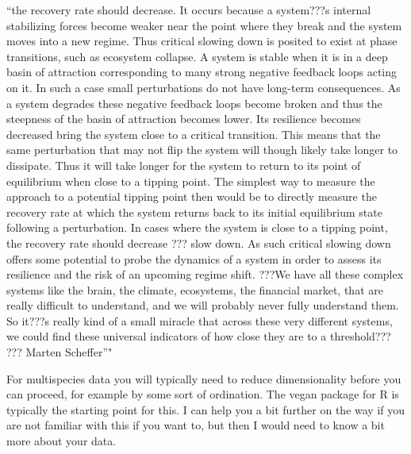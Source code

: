 \documentclass[12pt,twoside,openany]{reedthesis}
\begin{document}
``the recovery rate should decrease. It occurs because a system???s internal stabilizing forces become weaker near the point where they break and the system moves into a new regime. Thus critical slowing down is posited to exist at phase transitions, such as ecosystem collapse. A system is stable when it is in a deep basin of attraction corresponding to many strong negative feedback loops acting on it. In such a case small perturbations do not have long-term consequences. As a system degrades these negative feedback loops become broken and thus the steepness of the basin of attraction becomes lower.
Its resilience becomes decreased bring the system close to a critical transition. This means that the same perturbation that may not flip the system will though likely take longer to dissipate. Thus it will take longer for the system to return to its point of equilibrium when close to a tipping point. The simplest way to measure the approach to a potential tipping point then would be to directly measure the recovery rate at which the system returns back to its initial equilibrium state following a perturbation. In cases where the system is close to a tipping point, the recovery rate should decrease ??? slow down. As such critical slowing down offers some potential to probe the dynamics of a system in order to assess its resilience and the risk of an upcoming regime shift. ???We have all these complex systems like the brain, the climate, ecosystems, the financial market, that are really difficult to understand, and we will probably never fully understand them. So it???s really kind of a small miracle that across these very different systems, we could find these universal indicators of how close they are to a threshold??? ??? Marten Scheffer''"

For multispecies data you will typically need to reduce dimensionality before you can proceed, for example by some sort of ordination. The vegan package for R is typically the starting point for this. I can help you a bit further on the way if you are not familiar with this if you want to, but then I would need to know a bit more about your data.
\end{document}
